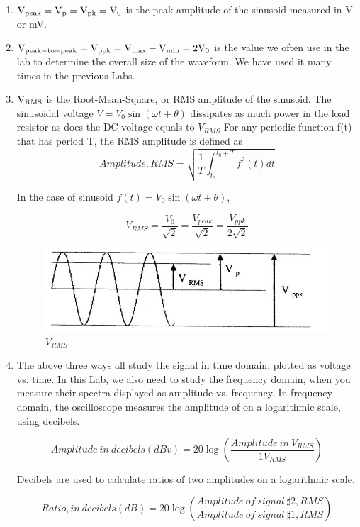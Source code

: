 \documentclass{article}
\begin{document}
\begin{enumerate}

\item
$\rm V_{peak}=V_p=V_{pk}=V_0$ is the peak amplitude of the sinusoid measured in V or mV.
\item
$\rm V_{peak-to-peak}=V_{ppk}=V_{max}-V_{min}=2V_0$ is the value we often use in the lab to determine the overall size of the waveform. We have used it many times in the previous Labs.
\item
$\rm V_{RMS}$ is the Root-Mean-Square, or RMS amplitude of the sinusoid. The sinusoidal voltage $V=V_0\sin(\omega t+\theta)$ dissipates as much power in the load resistor as does the DC voltage equals to $V_{RMS}$
For any periodic function f(t) that has period T, the RMS amplitude is defined as
$$Amplitude,RMS=\sqrt{\frac{1}{T}\int_{t_0}^{t_0+T}f^2(t)dt}$$

In the case of sinusoid $f(t)=V_0\sin(\omega t+\theta)$,

$$V_{RMS}=\frac{V_0}{\sqrt{2}}=\frac{V_{peak}}{\sqrt{2}}=\frac{V_{ppk}}{2\sqrt{2}}$$
  \begin{figure}[H]
  \centering
  \includegraphics[width=.6\textwidth]{Figure3.jpg}
  \caption{$V_{RMS}$}
  \label{img} 
\end{figure}


\item
The above three ways all study the signal in time domain, plotted as voltage vs. time. In this Lab, we also need to study the frequency domain, when you measure their spectra displayed as amplitude vs. frequency. In frequency domain, the oscilloscope measures the amplitude of on a logarithmic scale, using decibels.

$$Amplitude\ in\ decibels(dBv)=20\log\left(\frac{Amplitude\ in\ V_{RMS}}{1V_{RMS}}\right)$$

Decibels are used to calculate ratios of two amplitudes on a logarithmic scale.

$$Ratio,in\ decibels(dB)=20\log\left(\frac{Amplitude\ of\ signal\ \sharp 2,RMS}{Amplitude\ of\ signal\ \sharp 1,RMS}\right)$$

\end{enumerate}
\end{document}
